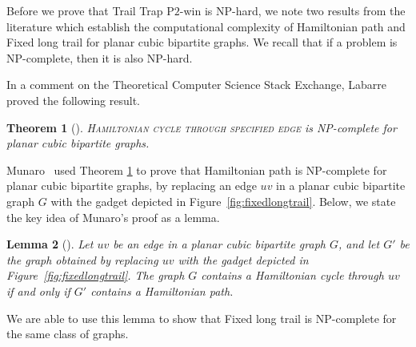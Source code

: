 \documentclass{article}
\theoremstyle{plain}
\newtheorem{theorem}{Theorem}
\newtheorem{lemma}[theorem]{Lemma}
\theoremstyle{definition}
\def\ptwo{{\rm{P}\ensuremath{2}}}
\begin{document}

Before we prove that {\sc Trail Trap \ptwo{}-win} is NP-hard, we note two results from the literature which establish the computational complexity of {\sc Hamiltonian path} and {\sc Fixed long trail} for planar cubic bipartite graphs. 
We recall that if a problem is NP-complete, then it is also NP-hard.


In a comment on the Theoretical Computer Science Stack Exchange, Labarre proved the following result.

\begin{theorem}[\cite{Labarre}]\label{thm:labarre}
    \textsc{Hamiltonian cycle through specified edge} is NP-complete for planar cubic bipartite graphs.
\end{theorem}


Munaro~\cite[Theorem~23]{MUNARO20171210} used Theorem \ref{thm:labarre} to prove that {\sc Hamiltonian path} is NP-complete for planar cubic bipartite graphs, by replacing an edge $uv$ in a planar cubic bipartite graph $G$ with the gadget depicted in Figure~\ref{fig:fixedlongtrail}.
Below, we state the key idea of Munaro's proof as a lemma. 

\begin{lemma}[{\cite[p.~1221]{MUNARO20171210}}]\label{lem:munaro}
    Let $uv$ be an edge in a planar cubic bipartite graph $G$, and let $G'$ be the graph obtained by replacing $uv$ with the gadget depicted in Figure~\ref{fig:fixedlongtrail}.
    The graph $G$ contains a Hamiltonian cycle through $uv$ if and only if $G'$ contains a Hamiltonian path.
\end{lemma}

We are able to use this lemma to show that {\sc Fixed long trail} is NP-complete for the same class of graphs.
\end{document}
